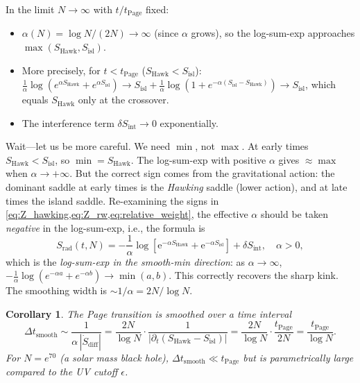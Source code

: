 \documentclass[12pt,a4paper]{article}
\newtheorem{corollary}[theorem]{Corollary}
\newcommand{\Srad}{S_{\mathrm{rad}}}
\newcommand{\SHawk}{S_{\mathrm{Hawk}}}
\newcommand{\Sisl}{S_{\mathrm{isl}}}
\newcommand{\dS}{\delta S}
\newcommand{\tPage}{t_{\mathrm{Page}}}
\newcommand{\e}{\mathrm{e}}
\begin{document}
In the limit $N\to\infty$ with $t/\tPage$ fixed:
\begin{itemize}
  \item $\alpha(N) = \log N / (2N) \to \infty$ (since $\alpha$ grows), so
    the log-sum-exp approaches $\max(\SHawk, \Sisl)$.
  \item More precisely, for $t < \tPage$ ($\SHawk < \Sisl$):
    $\frac{1}{\alpha}\log(e^{\alpha\SHawk}+e^{\alpha\Sisl})
    \to \Sisl + \frac{1}{\alpha}\log(1+e^{-\alpha(\Sisl-\SHawk)})
    \to \Sisl$, which equals $\SHawk$ only at the crossover.
  \item The interference term $\dS_{\mathrm{int}} \to 0$ exponentially.
\end{itemize}

Wait—let us be more careful.  We need $\min$, not $\max$.  At early times
$\SHawk < \Sisl$, so $\min = \SHawk$.  The log-sum-exp with positive $\alpha$
gives $\approx \max$ when $\alpha \to +\infty$.  But the correct sign comes
from the gravitational action: the dominant saddle at early times is the
\emph{Hawking} saddle (lower action), and at late times the island saddle.
Re-examining the signs in \cref{eq:Z_hawking,eq:Z_rw,eq:relative_weight},
the effective $\alpha$ should be taken \emph{negative} in the log-sum-exp,
i.e., the formula is
\begin{equation}
  \Srad(t,N) = -\frac{1}{\alpha}\log\!\left[\e^{-\alpha\SHawk} + \e^{-\alpha\Sisl}\right]
    + \dS_{\mathrm{int}},
\quad \alpha > 0,
\label{eq:main_result_v2}
\end{equation}
which is the \emph{log-sum-exp in the smooth-min direction}: as $\alpha\to\infty$,
$-\frac{1}{\alpha}\log(e^{-\alpha a}+e^{-\alpha b}) \to \min(a,b)$. This
correctly recovers the sharp kink.  The smoothing width is $\sim 1/\alpha = 2N/\log N$.

\begin{corollary}
\label{cor:smoothing_width}
The Page transition is smoothed over a time interval
\begin{equation}
  \Delta t_{\mathrm{smooth}} \sim \frac{1}{\alpha\,|\dot{S}_{\mathrm{diff}}|}
    = \frac{2N}{\log N}\cdot\frac{1}{|\partial_t(\SHawk - \Sisl)|}
    = \frac{2N}{\log N}\cdot\frac{\tPage}{2N}
    = \frac{\tPage}{\log N}.
\label{eq:smoothing_width}
\end{equation}
For $N = e^{70}$ (a solar mass black hole), $\Delta t_{\mathrm{smooth}} \ll \tPage$
but is parametrically large compared to the UV cutoff $\epsilon$.
\end{corollary}
\end{document}
